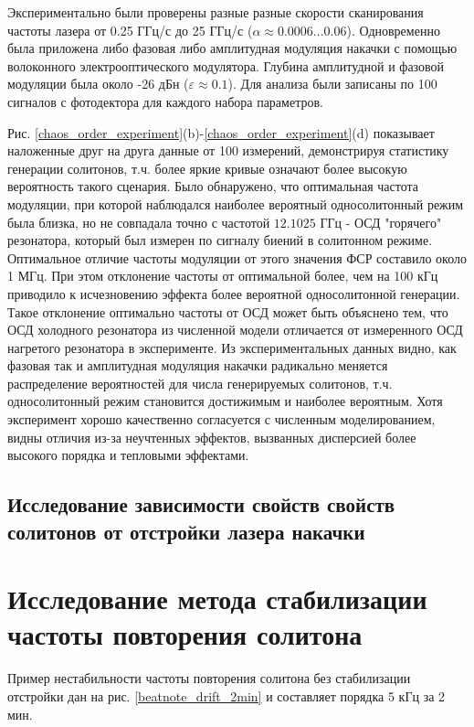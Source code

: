 Экспериментально были проверены разные разные скорости сканирования частоты лазера от 0.25 ГГц/с до 25 ГГц/с ($\alpha \approx 0.0006...0.06$). Одновременно была приложена либо фазовая либо амплитудная модуляция накачки с помощью волоконного электрооптического модулятора. Глубина амплитудной и фазовой модуляции была около -26 дБн ($\varepsilon \approx 0.1$). Для анализа были записаны по 100 сигналов с фотодектора для каждого набора параметров.

Рис. \ref{chaos_order_experiment}(b)-\ref{chaos_order_experiment}(d) показывает наложенные друг на друга данные от 100 измерений, демонстрируя статистику генерации солитонов, т.ч. более яркие кривые означают более высокую вероятность такого сценария. Было обнаружено, что оптимальная частота модуляции, при которой наблюдался наиболее вероятный односолитонный режим была близка, но не совпадала точно с частотой $12.1025$ ГГц - ОСД "горячего" резонатора, который был измерен по сигналу биений в солитонном режиме. Оптимальное отличие частоты модуляции от этого значения ФСР составило около 1 МГц. При этом отклонение частоты от оптимальной более, чем на 100 кГц приводило к исчезновению эффекта более вероятной односолитонной генерации. Такое отклонение оптимально частоты от ОСД может быть объяснено тем, что ОСД холодного резонатора из численной модели отличается от измеренного ОСД нагретого резонатора в эксперименте. Из экспериментальных данных видно, как фазовая так и амплитудная модуляция накачки радикально меняется распределение вероятностей для числа генерируемых солитонов, т.ч. односолитонный режим становится достижимым и наиболее вероятным. Хотя эксперимент хорошо качественно согласуется с численным моделированием, видны отличия из-за неучтенных эффектов, вызванных дисперсией более высокого порядка и тепловыми эффектами.

\subsection{Исследование зависимости свойств свойств солитонов от отстройки лазера накачки}


\section{Исследование метода стабилизации частоты повторения солитона} 

Пример нестабильности частоты повторения солитона без стабилизации отстройки дан на рис. \ref{beatnote_drift_2min} и составляет порядка 5 кГц за 2 мин.

